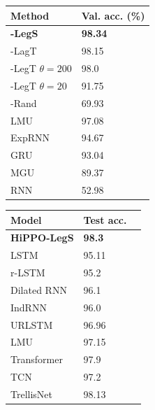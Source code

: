\begin{minipage}{.58\linewidth}
    \small
        \centering
        \begin{tabular}{@{}ll@{}}
            \toprule
            Method                     & Val. acc. (\%) \\
            \midrule
            \textbf{-LegS}        & \textbf{98.34}           \\
            -LagT            & 98.15                    \\
            -LegT $\theta = 200$  & 98.0                     \\
            -LegT $\theta = 20$   & 91.75                    \\
            -Rand                 & 69.93 \\
            \midrule
            LMU                        & 97.08                    \\
            ExpRNN                     & 94.67                    \\
            GRU                        & 93.04                    \\
            MGU                        & 89.37                    \\
            RNN                        & 52.98                    \\
            \bottomrule
        \end{tabular}%
        \hfill
        \begin{tabular}{@{}lll@{}}
            \toprule
            Model                                    & Test acc.        \\
            \midrule
            \textbf{HiPPO-LegS}                                & \textbf{98.3} \\
            \midrule
            LSTM~\citep{gu2020improving}              & 95.11         \\
            r-LSTM~\citep{trinh2018learning}         & 95.2          \\
            Dilated RNN~\citep{chang2017dilated}      & 96.1          \\
            IndRNN~\citep{indrnn}                     & 96.0          \\
            URLSTM~\citep{gu2020improving}            & 96.96         \\
            LMU~\citep{voelker2019legendre}           & 97.15         \\
            \midrule
            Transformer~\citep{trinh2018learning}     & 97.9          \\
            TCN~\citep{bai2018empirical} & 97.2          \\
            TrellisNet~\citep{trellisnet}             & 98.13         \\
            \bottomrule
        \end{tabular}
    \label{tab:pmnist}
\end{minipage}

